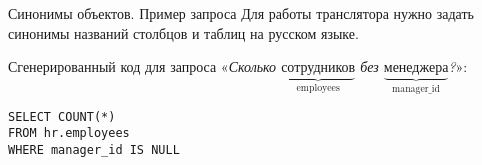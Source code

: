\begin{frame}[fragile]{Синонимы объектов. Пример запроса}%
  Для работы транслятора нужно задать синонимы названий столбцов и таблиц на русском языке.

  Сгенерированный код для запроса «\textit{Сколько $ \underbrace{\text{сотрудников}}_{\text{employees}} $ без $ \underbrace{\text{менеджера}}_{\text{manager\_id}} $?}»:

  \begin{verbatim}
SELECT COUNT(*)
FROM hr.employees
WHERE manager_id IS NULL
  \end{verbatim}

\end{frame}
